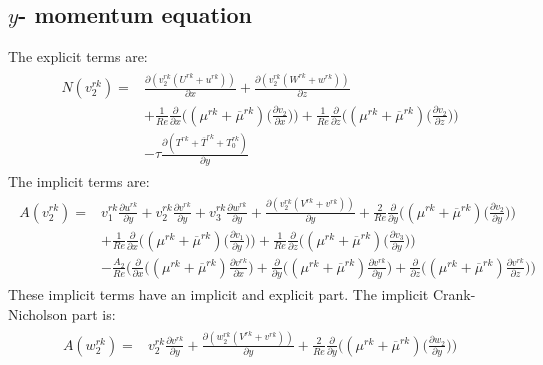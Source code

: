 \documentclass[preprint,12pt]{article}
\begin{document}
\subsection{$y$- momentum equation}
The explicit terms are:
\begin{align}\begin{split}
N(v_2^{rk})=&\frac{\partial (v_2^{rk}(U^{rk}+u^{rk}))}{\partial x}+\frac{\partial (v_2^{rk}(W^{rk}+w^{rk}))}{\partial z}\\&+\frac{1}{Re}\frac{\partial}{\partial x}\Big(({\mu^{rk}}+\overline{\mu}^{rk})\Big(\frac{\partial v_2}{\partial x}\Big)\Big)+\frac{1}{Re}\frac{\partial}{\partial z}\Big(({\mu^{rk}}+\overline{\mu}^{rk})\Big(\frac{\partial v_2}{\partial z}\Big)\Big)\\&-\tau\frac{\partial (T^{rk}+\overline{T}^{rk}+T_0^{rk})}{\partial y}
\end{split} \end{align}	
The implicit terms are:
\begin{align}\begin{split}
A(v_2^{rk})=&v_1^{rk}\frac{\partial u^{rk}}{\partial y}+v_2^{rk}\frac{\partial v^{rk}}{\partial y}+v_3^{rk}\frac{\partial w^{rk}}{\partial y}+\frac{\partial (v_2^{rk}(V^{rk}+v^{rk}))}{\partial y}+\frac{2}{Re}\frac{\partial}{\partial y}\Big(({\mu^{rk}}+\overline{\mu}^{rk})\Big(\frac{\partial v_2}{\partial y}\Big)\Big)\\&+\frac{1}{Re}\frac{\partial}{\partial x}\Big(({\mu^{rk}}+\overline{\mu}^{rk})\Big(\frac{\partial v_1}{\partial y}\Big)\Big)+\frac{1}{Re}\frac{\partial}{\partial z}\Big(({\mu}^{rk}+\overline{\mu}^{rk})\Big(\frac{\partial v_3}{\partial y}\Big)\Big)\\&-\frac{A_2}{Re}\Bigg(\frac{\partial}{\partial x}\Big((\mu^{rk}+\overline{\mu}^{rk})\frac{\partial v^{rk}}{\partial x}\Big)+\frac{\partial}{\partial y}\Big((\mu^{rk}+\overline{\mu}^{rk})\frac{\partial v^{rk}}{\partial y}\Big)+\frac{\partial}{\partial z}\Big((\mu^{rk}+\overline{\mu}^{rk})\frac{\partial v^{rk}}{\partial z}\Big)\Bigg)
\end{split} \end{align}	
These implicit terms have an implicit and explicit part. The implicit Crank- Nicholson part is:
\begin{align}\begin{split}
A(w_2^{rk})=&v_2^{rk}\frac{\partial v^{rk}}{\partial y}+\frac{\partial (w_2^{rk}(V^{rk}+v^{rk}))}{\partial y}+\frac{2}{Re}\frac{\partial}{\partial y}\Big(({\mu}^{rk}+\overline{\mu}^{rk})\Big(\frac{\partial w_2}{\partial y}\Big)\Big)
\end{split} \end{align}	
\end{document}
